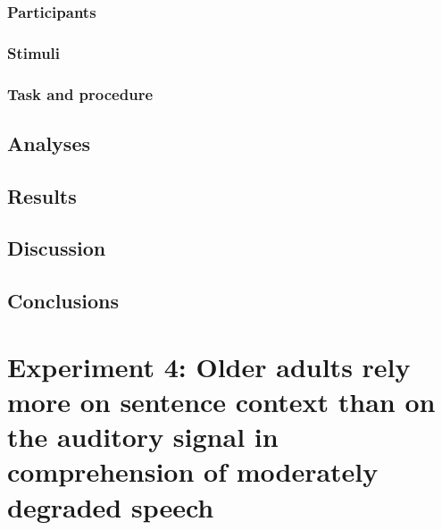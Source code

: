 \documentclass[a4paper, nobind]{templates/ociamthesis}
\begin{document}
\hypertarget{participants-3}{%
\subsection{Participants}\label{participants-3}}

\hypertarget{stimuli-3}{%
\subsection{Stimuli}\label{stimuli-3}}

\hypertarget{task-and-procedure-2}{%
\subsection{Task and procedure}\label{task-and-procedure-2}}

\hypertarget{analyses-3}{%
\section{Analyses}\label{analyses-3}}

\hypertarget{results-3}{%
\section{Results}\label{results-3}}

\hypertarget{discussion-2}{%
\section{Discussion}\label{discussion-2}}

\hypertarget{conclusions-1}{%
\section{Conclusions}\label{conclusions-1}}

\hypertarget{experiment-4-older-adults-rely-more-on-sentence-context-than-on-the-auditory-signal-in-comprehension-of-moderately-degraded-speech}{%
\chapter{Experiment 4: Older adults rely more on sentence context than on the auditory signal in comprehension of moderately degraded speech}\label{experiment-4-older-adults-rely-more-on-sentence-context-than-on-the-auditory-signal-in-comprehension-of-moderately-degraded-speech}}

\minitoc
\end{document}
